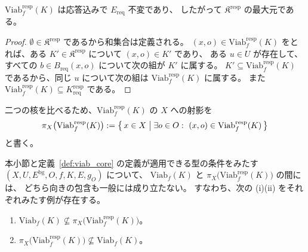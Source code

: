 \begin{proposition}[応答込み頑健可行性核の不変性]
\label{prop:viab_resp_max}
$\mathrm{Viab}^{\mathrm{resp}}_f(K)$ は応答込みで $E_{\mathrm{req}}$ 不変であり、
したがって $\mathfrak{K}^{\mathrm{resp}}$ の最大元である。
\end{proposition}

\begin{proof}
$\emptyset\in\mathfrak{K}^{\mathrm{resp}}$ であるから和集合は定義される。
$(x,o)\in\mathrm{Viab}^{\mathrm{resp}}_f(K)$ をとれば、ある $K'\in\mathfrak{K}^{\mathrm{resp}}$ について $(x,o)\in K'$ であり、
ある $u\in U$ が存在して、すべての $b\in B_{\mathrm{req}}(x,o)$ について次の組が $K'$ に属する。
$K'\subseteq\mathrm{Viab}^{\mathrm{resp}}_f(K)$ であるから、同じ $u$ について次の組は $\mathrm{Viab}^{\mathrm{resp}}_f(K)$ に属する。
また $\mathrm{Viab}^{\mathrm{resp}}_f(K)\subseteq K_{\mathrm{req}}^{\mathrm{resp}}$ である。
\end{proof}

二つの核を比べるため、$\mathrm{Viab}^{\mathrm{resp}}_f(K)$ の $X$ への射影を
\[
  \pi_X\bigl(\mathrm{Viab}^{\mathrm{resp}}_f(K)\bigr)
  :=
  \bigl\{\,x\in X\bigm|\exists o\in O:\ (x,o)\in\mathrm{Viab}^{\mathrm{resp}}_f(K)\,\bigr\}
\]
と書く。

\begin{proposition}[二つの頑健性の非包含]
\label{prop:robust_noninclusion}
本小節と定義~\ref{def:viab_core} の定義が適用できる型の条件をみたす
$(X,U,E^{\mathrm{bg}},O,f,K,E,g_O)$ について、
$\mathrm{Viab}_f(K)$ と $\pi_X\bigl(\mathrm{Viab}^{\mathrm{resp}}_f(K)\bigr)$ の間には、
どちら向きの包含も一般には成り立たない。
すなわち、次の (i)(ii) をそれぞれみたす例が存在する。
\begin{enumerate}[label=(\roman*)]
  \item $\mathrm{Viab}_f(K)\not\subseteq\pi_X\bigl(\mathrm{Viab}^{\mathrm{resp}}_f(K)\bigr)$。
  \item $\pi_X\bigl(\mathrm{Viab}^{\mathrm{resp}}_f(K)\bigr)\not\subseteq\mathrm{Viab}_f(K)$。
\end{enumerate}
\end{proposition}

